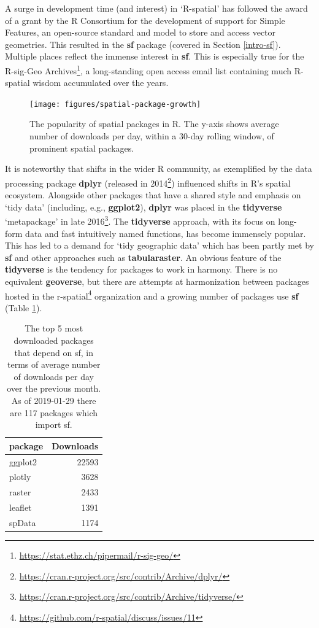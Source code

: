 \documentclass[]{krantz}
\let\rmarkdownfootnote\footnote%
\def\footnote{\protect\rmarkdownfootnote}
\renewcommand{\href}[2]{#2\footnote{\url{#1}}}
\begin{document}
A surge in development time (and interest) in `R-spatial' has followed the award of a grant by the R Consortium for the development of support for Simple Features, an open-source standard and model to store and access vector geometries.
This resulted in the \textbf{sf} package (covered in Section \ref{intro-sf}).
Multiple places reflect the immense interest in \textbf{sf}. This is especially true for the \href{https://stat.ethz.ch/pipermail/r-sig-geo/}{R-sig-Geo Archives}, a long-standing open access email list containing much R-spatial wisdom accumulated over the years.

\begin{figure}[t]

{\centering \texttt{[image: figures/spatial-package-growth]} 

}

\caption[The popularity of spatial packages in R.]{The popularity of spatial packages in R. The y-axis shows average number of downloads per day, within a 30-day rolling window, of prominent spatial packages.}\label{fig:cranlogs}
\end{figure}

It is noteworthy that shifts in the wider R community, as exemplified by the data processing package \textbf{dplyr} (released in \href{https://cran.r-project.org/src/contrib/Archive/dplyr/}{2014}) influenced shifts in R's spatial ecosystem.
Alongside other packages that have a shared style and emphasis on `tidy data' (including, e.g., \textbf{ggplot2}), \textbf{dplyr} was placed in the \textbf{tidyverse} `metapackage' in late \href{https://cran.r-project.org/src/contrib/Archive/tidyverse/}{2016}.
The \textbf{tidyverse} approach, with its focus on long-form data and fast intuitively named functions, has become immensely popular.
This has led to a demand for `tidy geographic data' which has been partly met by \textbf{sf} and other approaches such as \textbf{tabularaster}.
An obvious feature of the \textbf{tidyverse} is the tendency for packages to work in harmony.
There is no equivalent \textbf{geoverse}, but there are attempts at harmonization between packages hosted in the \href{https://github.com/r-spatial/discuss/issues/11}{r-spatial} organization and a growing number of packages use \textbf{sf} (Table \ref{tab:revdep}).

\begin{table}[t]

\caption[Top 5 most downloaded packages depending on sf.]{\label{tab:revdep}The top 5 most downloaded packages that depend on sf, in terms of average number of downloads per day over the previous month. As of 2019-01-29  there are  117  packages which import sf.}
\centering
\begin{tabular}{lr}
\toprule
package & Downloads\\
\midrule
ggplot2 & 22593\\
plotly & 3628\\
raster & 2433\\
leaflet & 1391\\
spData & 1174\\
\bottomrule
\end{tabular}
\end{table}
\end{document}
